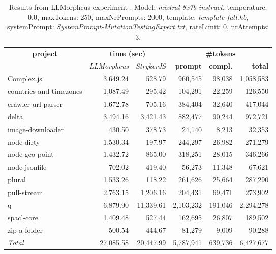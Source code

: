 
\begin{table*}[hbt!]
\centering
{\scriptsize
\begin{tabular}{l||r|r|r|r|r}
\multicolumn{1}{c|}{\bf project} & \multicolumn{2}{|c|}{\bf time (sec)} & \multicolumn{3}{|c|}{\bf \#tokens} \\
               & {\it LLMorpheus} & {\it StrykerJS} & {\bf prompt} & {\bf compl.} & {\bf total} \\
\hline
  Complex.js & 3,649.24 & 528.79 & 960,545 & 98,038 & 1,058,583 \\ 
countries-and-timezones & 1,087.49 & 295.42 & 104,291 & 22,259 & 126,550 \\ 
crawler-url-parser & 1,672.78 & 705.16 & 384,404 & 32,640 & 417,044 \\ 
delta & 3,494.16 & 3,421.43 & 882,477 & 90,244 & 972,721 \\ 
image-downloader & 430.50 & 378.73 & 24,140 & 8,213 & 32,353 \\ 
node-dirty & 1,530.34 & 197.97 & 244,297 & 26,982 & 271,279 \\ 
node-geo-point & 1,432.72 & 865.00 & 318,251 & 28,015 & 346,266 \\ 
node-jsonfile & 702.02 & 419.40 & 56,273 & 11,348 & 67,621 \\ 
plural & 1,533.26 & 118.22 & 261,626 & 25,664 & 287,290 \\ 
pull-stream & 2,763.15 & 1,206.16 & 204,431 & 69,471 & 273,902 \\ 
q & 6,879.90 & 11,339.61 & 2,103,232 & 191,046 & 2,294,278 \\ 
spacl-core & 1,409.48 & 527.44 & 162,695 & 26,807 & 189,502 \\ 
zip-a-folder & 500.54 & 444.67 & 81,279 & 9,009 & 90,288 \\ 
\hline
  \textit{Total} & 27,085.58 & 20,447.99 & 5,787,941 & 639,736 & 6,427,677 \\
  \end{tabular}
  }
  \\[2mm]
  \caption{Results from LLMorpheus experiment .
    Model: \textit{mixtral-8x7b-instruct}, 
    temperature: 0.0, 
    maxTokens: 250, 
    maxNrPrompts: 2000, 
    template: \textit{template-full.hb}, 
    systemPrompt: \textit{SystemPrompt-MutationTestingExpert.txt}, 
    rateLimit: 0, 
    nrAttempts: 3.  
  }
  \label{table:Cost:run364:mixtral-8x7b-instruct:template-full.hb:0.0}
\end{table*}